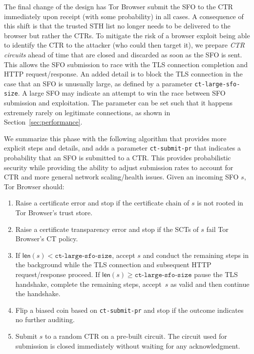 The final change of the design has Tor Browser submit the SFO to the CTR
immediately upon receipt (with some probability) in all cases. A consequence of
this shift is that the trusted STH list no longer needs to be delivered to the
browser but rather the CTRs. To mitigate the risk of a browser exploit being
able to identify the CTR to the attacker (who could then target it), we prepare
\emph{CTR circuits} ahead of time that are closed and discarded as soon as the
SFO is sent. This allows the SFO submission to race with the TLS connection
completion and HTTP request/response. An added detail is to block the TLS
connection in the case that an SFO is unusually large, as defined by a parameter
\texttt{ct-large-sfo-size}. A large SFO may indicate an attempt to win the race
between SFO submission and exploitation. The parameter can be set such that it
happens extremely rarely on legitimate connections, as shown in
Section~\ref{sec:performance}.

We summarize this phase with the following algorithm that provides more explicit
steps and details, and adds a parameter \texttt{ct-submit-pr} that indicates a
probability that an SFO is submitted to a CTR. This provides probabilistic
security while providing the ability to adjust submission rates to account for
CTR and more general network scaling/health issues. Given an incoming SFO $s$,
Tor Browser should:
\begin{enumerate}
    \item Raise a certificate error and stop if the certificate chain of $s$
        is not rooted in Tor Browser's trust store.
    \item Raise a certificate transparency error and stop if the SCTs of $s$
        fail Tor Browser's CT policy.
    \item If $\mathsf{len}(s) < \texttt{ct-large-sfo-size}$, accept $s$ and
        conduct the remaining steps in the background while the TLS connection
        and subsequent HTTP request/response proceed. If $\mathsf{len}(s) \geq
        \texttt{ct-large-sfo-size}$ pause the TLS handshake, complete the
        remaining steps, accept~$s$ as valid and then continue the handshake.
    \item Flip a biased coin based on \texttt{ct-submit-pr} and stop if the
        outcome indicates no further auditing.
    \item Submit $s$ to a random CTR on a pre-built circuit. The circuit used
        for submission is closed immediately without waiting for any
        acknowledgment.
\end{enumerate}

